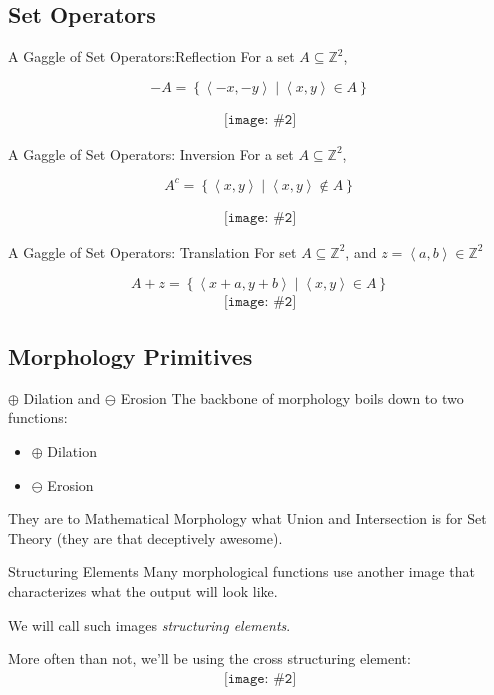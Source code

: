 \documentclass{beamer}
\newcommand{\pic}[2]{
     \begin{array}{l}
      \texttt{[image: \#2]}
      \end{array}
}
\newcommand{\set}[1]{\left\lbrace #1 \right\rbrace}
\newcommand{\buildset}[2]{\set{#1 \mid #2}}
\newcommand{\tuple}[1]{\left\langle #1 \right\rangle}
\newcommand{\integers}{\mathbb{Z}}
\newcommand{\dilate}{\oplus}
\newcommand{\erode}{\ominus}
\begin{document}
\subsection{Set Operators}
\begin{frame}{A Gaggle of Set Operators:Reflection}
  For a set $A \subseteq \integers^2$,

           $$-A = \buildset{\tuple{-x,-y}}
                          {\tuple{x,y} \in A}$$

           $$\pic{width=50pt}{./images/coolhamblen_reflected.png}$$
\end{frame}
%
\begin{frame}{A Gaggle of Set Operators: Inversion}
   For a set $A \subseteq \integers^2$,
          
          $$A^c = \buildset{\tuple{x,y}}
                          {\tuple{x,y}\not\in A}$$

          $$\pic{width=50pt}{./images/coolhamblen_complement.png}$$
\end{frame}
\begin{frame}{A Gaggle of Set Operators: Translation}
  For set $A \subseteq \mathbb{Z}^2$, and $z=\tuple{a,b} \in \mathbb{Z}^2$


    $$A+z = \buildset{\tuple{x+a,y+b}}
                    {\tuple{x,y} \in A}$$
    $$\pic{width=50pt}{./images/coolhamblen_translated.png}$$
\end{frame} 

\subsection{Morphology Primitives}
\begin{frame}{$\dilate$ Dilation and $\erode$ Erosion}
  The backbone of morphology boils down to two functions:
  \begin{itemize}
    \item $\dilate$ Dilation
    \item $\erode$ Erosion
  \end{itemize}
  They are to Mathematical Morphology what Union and Intersection is for
  Set Theory (they are that deceptively awesome).
\end{frame}

\begin{frame}{Structuring Elements}
  Many morphological functions use another image that characterizes 
  what the output will look like.

  We will call such images \emph{structuring elements}.

  More often than not, we'll be using the cross structuring element:
  $$\pic{width=50pt}{images/cross.png}$$
\end{frame}
\end{document}
